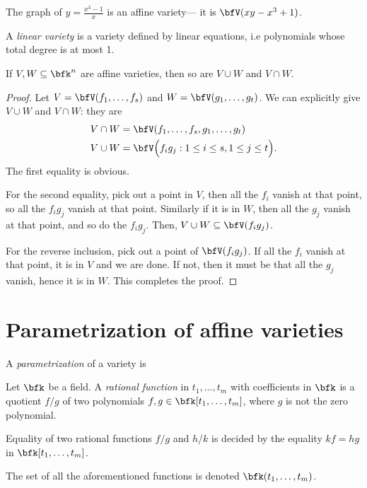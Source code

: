 \documentclass{article}
\begin{document}
\begin{example}
    The graph of $y = \frac{x^3-1}{x}$ is an affine variety--- it is $\bfV(xy - x^3 + 1)$.
\end{example}


\begin{definition}
    A \textit{linear variety} is a variety defined by linear equations, i.e polynomials whose total degree is at most 1.
\end{definition}

\begin{lemma}
    If $V, W \subseteq \bfk^n$ are affine varieties, then so are $V \cup W$ and $V \cap W$.
\end{lemma}

\begin{proof}
    Let $V = \bfV(f_1,\ldots,f_s)$ and $W = \bfV(g_1,\ldots,g_t)$.
    We can explicitly give $V \cup W$ and $V \cap W$: they are
    \begin{align*}
        V \cap W &= \bfV(f_1,\ldots,f_s,g_1,\ldots,g_t) \\
        V \cup W &= \bfV\Big(f_ig_j: 1\leq i \leq s, 1 \leq j \leq t\Big).
    \end{align*}
    The first equality is obvious.

    For the second equality, pick out a point in $V$, then all the $f_i$ vanish at that point, so all the $f_ig_j$ vanish at that point.
    Similarly if it is in $W$, then all the $g_j$ vanish at that point, and so do the $f_ig_j$.
    Then, $V \cup W \subseteq \bfV(f_ig_j)$.

    For the reverse inclusion, pick out a point of $\bfV(f_ig_j)$.
    If all the $f_i$ vanish at that point, it is in $V$ and we are done.
    If not, then it must be that all the $g_j$ vanish, hence it is in $W$.
    This completes the proof.
\end{proof}

\section{Parametrization of affine varieties}

A \textit{parametrization} of a variety is

\begin{definition}
    Let $\bfk$ be a field.
    A \textit{rational function} in $t_1,\ldots,t_m$ with coefficients in $\bfk$ is a quotient $f/g$ of two polynomials $f,g \in \bfk[t_1,\ldots,t_m]$, where $g$ is not the zero polynomial.

    Equality of two rational functions $f/g$ and $h/k$ is decided by the equality $kf = hg$ in $\bfk[t_1,\ldots,t_m]$.

    The set of all the aforementioned functions is denoted $\bfk(t_1,\ldots,t_m)$.
\end{definition}
\end{document}
